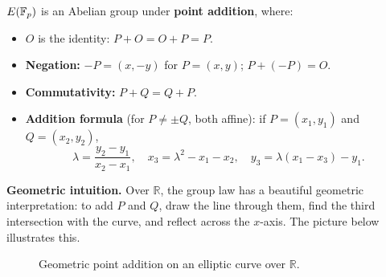 \documentclass[11pt]{article}
\begin{document}
\begin{theorem}
  $E(\mathbb{F}_p)$ is an Abelian group under \textbf{point addition}, where:
  \begin{itemize}
    \item $O$ is the identity: $P + O = O + P = P$.
    \item \textbf{Negation:} $-P = (x, -y)$ for $P = (x, y)$;
      $P + (-P) = O$.
    \item \textbf{Commutativity:} $P + Q = Q + P$.
    \item \textbf{Addition formula} (for $P \neq \pm Q$, both affine):
      if $P = (x_1, y_1)$ and $Q = (x_2, y_2)$,
      \[
        \lambda = \frac{y_2 - y_1}{x_2 - x_1},\quad
        x_3 = \lambda^2 - x_1 - x_2,\quad
        y_3 = \lambda(x_1 - x_3) - y_1.
      \]
  \end{itemize}
\end{theorem}

\noindent\textbf{Geometric intuition.}
Over $\mathbb{R}$, the group law has a beautiful geometric interpretation:
to add $P$ and $Q$, draw the line through them, find the third intersection
with the curve, and reflect across the $x$-axis.  The picture below
illustrates this.

\begin{figure}[t]
\centering
{}
\caption{Geometric point addition on an elliptic curve over $\mathbb{R}$.}
\end{figure}

\end{document}
